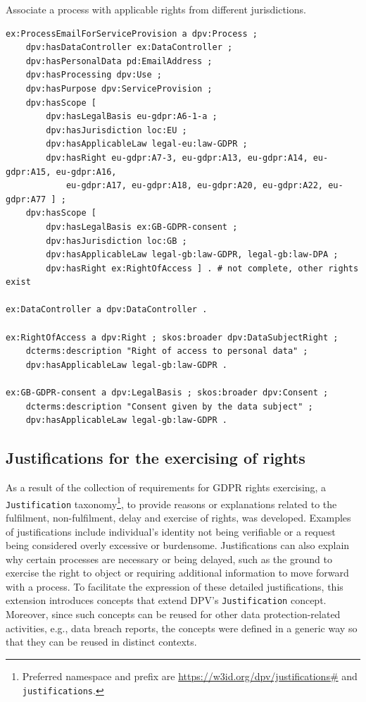 \documentclass{IOS-Book-Article}     %
\begin{document}
\begin{listing}[ht]
\caption{Associate a process with applicable rights from different jurisdictions.}
\label{lst:rights}
\begin{verbatim}
ex:ProcessEmailForServiceProvision a dpv:Process ;
    dpv:hasDataController ex:DataController ;
    dpv:hasPersonalData pd:EmailAddress ;
    dpv:hasProcessing dpv:Use ;
    dpv:hasPurpose dpv:ServiceProvision ;
    dpv:hasScope [
        dpv:hasLegalBasis eu-gdpr:A6-1-a ;
        dpv:hasJurisdiction loc:EU ;
        dpv:hasApplicableLaw legal-eu:law-GDPR ;
        dpv:hasRight eu-gdpr:A7-3, eu-gdpr:A13, eu-gdpr:A14, eu-gdpr:A15, eu-gdpr:A16, 
            eu-gdpr:A17, eu-gdpr:A18, eu-gdpr:A20, eu-gdpr:A22, eu-gdpr:A77 ] ;
    dpv:hasScope [
        dpv:hasLegalBasis ex:GB-GDPR-consent ;
        dpv:hasJurisdiction loc:GB ;
        dpv:hasApplicableLaw legal-gb:law-GDPR, legal-gb:law-DPA ;
        dpv:hasRight ex:RightOfAccess ] . # not complete, other rights exist

ex:DataController a dpv:DataController .

ex:RightOfAccess a dpv:Right ; skos:broader dpv:DataSubjectRight ;
    dcterms:description "Right of access to personal data" ;
    dpv:hasApplicableLaw legal-gb:law-GDPR .

ex:GB-GDPR-consent a dpv:LegalBasis ; skos:broader dpv:Consent ;
    dcterms:description "Consent given by the data subject" ;
    dpv:hasApplicableLaw legal-gb:law-GDPR .
\end{verbatim}
\end{listing}

\subsection{Justifications for the exercising of rights}
\label{sec:justifications}

As a result of the collection of requirements for GDPR rights exercising, a \texttt{Justification} taxonomy\footnote{Preferred namespace and prefix are \url{https://w3id.org/dpv/justifications\#} and \texttt{justifications}.}, to provide reasons or explanations related to the fulfilment, non-fulfilment, delay and exercise of rights, was developed.
Examples of justifications include individual's identity not being verifiable or a request being considered overly excessive or burdensome.
Justifications can also explain why certain processes are necessary or being delayed, such as the ground to exercise the right to object or requiring additional information to move forward with a process.
To facilitate the expression of these detailed justifications, this extension introduces concepts that extend DPV's \texttt{Justification} concept.
Moreover, since such concepts can be reused for other data protection-related activities, e.g., data breach reports, the concepts were defined in a generic way so that they can be reused in distinct contexts.
\end{document}

